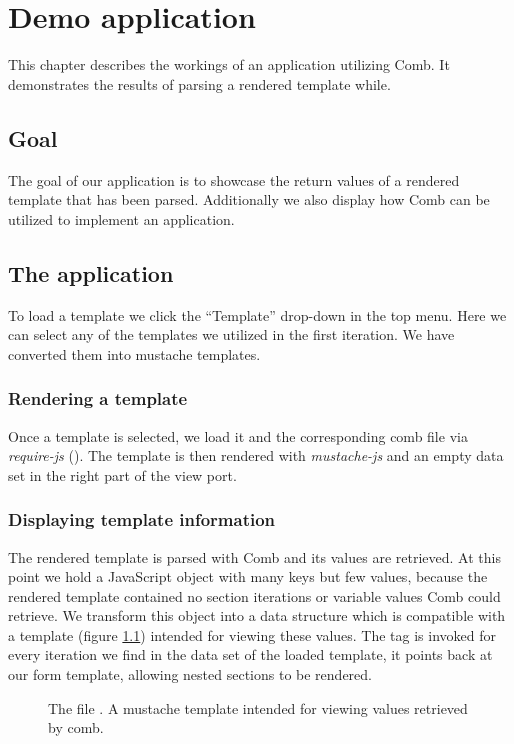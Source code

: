 \documentclass[thesis.tex]{subfiles}
\begin{document}
\chapter{Demo application}
\label{chap:demo}
This chapter describes the workings of an application utilizing Comb.
It demonstrates the results of parsing a rendered template while.

\section{Goal}
The goal of our application is to showcase the return values of a
rendered template that has been parsed.
Additionally we also display how Comb can be utilized to implement an
application.

\section{The application}
To load a template we click the ``Template'' drop-down in the top menu.
Here we can select any of the templates we utilized in the first iteration.
We have converted them into mustache templates.

\subsection{Rendering a template}
Once a template is selected, we load it and the corresponding comb file via
\emph{require-js} (). The template is then rendered with
\emph{mustache-js} and an empty data set in the right part of the view port.

\subsection{Displaying template information}
The rendered template is parsed with Comb and its values are retrieved.
At this point we hold a JavaScript object with many keys but few values,
because the rendered template contained no section iterations or variable values
Comb could retrieve. We transform this object into a data structure which is
compatible with a template (figure \ref{fig:mustache.mustache}) intended for
viewing these values. The  tag is invoked for every
iteration we find in the data set of the loaded template, it points back at our
form template, allowing nested sections to be rendered.

\begin{figure}
	\centering
	\caption{
		The file .
		A mustache template intended for viewing values retrieved by comb.}
	\label{fig:mustache.mustache}
	
\end{figure}
\end{document}
